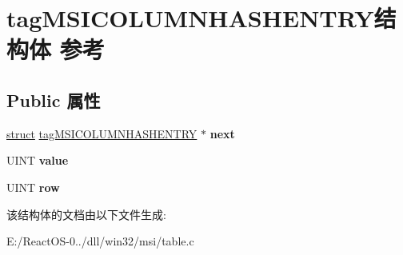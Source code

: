 \hypertarget{structtag_m_s_i_c_o_l_u_m_n_h_a_s_h_e_n_t_r_y}{}\section{tag\+M\+S\+I\+C\+O\+L\+U\+M\+N\+H\+A\+S\+H\+E\+N\+T\+R\+Y结构体 参考}
\label{structtag_m_s_i_c_o_l_u_m_n_h_a_s_h_e_n_t_r_y}
\subsection*{Public 属性}
\begin{DoxyCompactItemize}
\item 
\mbox{\label{structtag_m_s_i_c_o_l_u_m_n_h_a_s_h_e_n_t_r_y_aa14a7e483e4bf213ca20b9c495943475}} 
\hyperlink{interfacestruct}{struct} \hyperlink{structtag_m_s_i_c_o_l_u_m_n_h_a_s_h_e_n_t_r_y}{tag\+M\+S\+I\+C\+O\+L\+U\+M\+N\+H\+A\+S\+H\+E\+N\+T\+RY} $\ast$ {\bfseries next}
\item 
\mbox{\label{structtag_m_s_i_c_o_l_u_m_n_h_a_s_h_e_n_t_r_y_ab8b44a7f037fc9e077c169c54c33351d}} 
U\+I\+NT {\bfseries value}
\item 
\mbox{\label{structtag_m_s_i_c_o_l_u_m_n_h_a_s_h_e_n_t_r_y_ad392c92c512a68c91740ac8c27df9dd6}} 
U\+I\+NT {\bfseries row}
\end{DoxyCompactItemize}


该结构体的文档由以下文件生成\+:\begin{DoxyCompactItemize}
\item 
E\+:/\+React\+O\+S-\/0../dll/win32/msi/table.\+c\end{DoxyCompactItemize}
